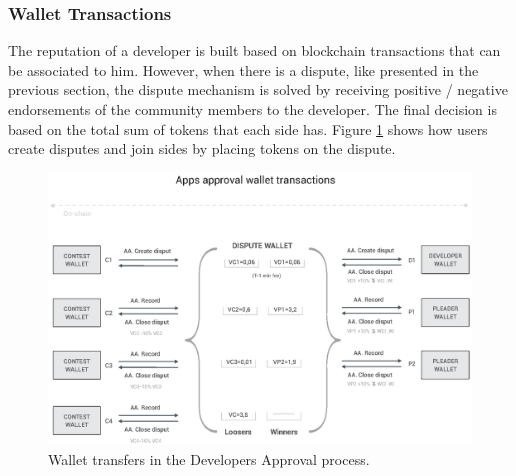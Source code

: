 \subsubsection{Wallet Transactions}

The reputation of a developer is built based on blockchain transactions that can be associated to him. However, when there is a dispute, like presented in the previous section, the dispute mechanism is solved by receiving positive / negative endorsements of the community members to the developer. The final decision is based on the total sum of tokens that each side has. Figure \ref{fig:wallet_developers_approval} shows how users create disputes and join sides by placing tokens on the dispute.

\begin{figure}[!ht]
\centering
\includegraphics[width=\textwidth]{diagrams/wallet_transfers_approval.eps}
\caption{Wallet transfers in the Developers Approval process.}
\label{fig:wallet_developers_approval}
\end{figure}










